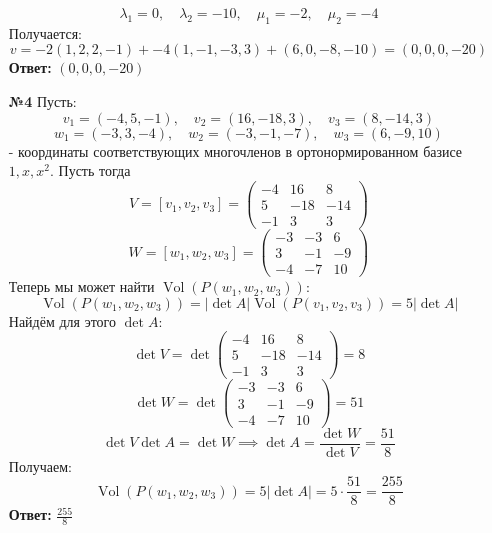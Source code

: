 \documentclass[a4paper]{article}
\newcommand{\mat}[1]{\begin{pmatrix} #1 \end{pmatrix}}
\renewcommand{\f}[2]{\frac{#1}{#2}}
\newcommand{\lr}{\Leftrightarrow}
\newcommand{\Vol}{\operatorname{Vol}}
\begin{document}
\begin{enumerate}
    \[
    \lambda_1 = 0,\quad \lambda_2 = -10,\quad \mu_1 = -2,\quad \mu_2 = -4
    \]
    Получается:
    $$v = -2(1, 2, 2, -1) + -4 (1, -1, -3, 3) + (6, 0, -8, -10) = (0, 0, 0, -20)$$
    \textbf{Ответ: } $(0, 0, 0, -20)$\\


    \item[\textbf{№4}]Пусть:
    $$v_1 = (-4, 5, -1), \quad v_2 = (16, -18, 3), \quad v_3 = (8, -14, 3)$$
    $$w_1 = (-3, 3, -4), \quad w_2 = (-3, -1, -7), \quad w_3 = (6, -9, 10)$$
    - координаты соответствующих многочленов в ортонормированном базисе $1, x, x^2$. Пусть тогда
    $$V = [v_1, v_2, v_3] = \mat{-4 & 16 & 8\\5 &-18 & -14\\-1& 3 & 3}$$
    $$W = [w_1, w_2, w_3] = \mat{-3 & -3 & 6\\ 3 & -1 & -9 \\ -4 & -7 & 10}$$
    Теперь мы может найти $\Vol(P(w_1, w_2, w_3))$:
    $$\Vol(P(w_1, w_2, w_3)) = |\det A| \Vol(P(v_1, v_2, v_3)) = 5|\det A|$$
    Найдём для этого $\det A$:
    $$\det V =  \det \mat{-4 & 16 & 8\\5 &-18 & -14\\-1& 3 & 3} = 8$$
    $$\det W = \det \mat{-3 & -3 & 6\\ 3 & -1 & -9 \\ -4 & -7 & 10} = 51$$
    $$\det V \det A = \det W \implies \det A = \f{\det W}{\det V} = \f{51}{8}$$
    Получаем:
    $$\Vol(P(w_1, w_2, w_3)) = 5|\det A| = 5\cdot \f{51}{8} = \f{255}{8}$$
    \textbf{Ответ: }$\f{255}{8}$\\


\end{enumerate}
\end{document}
